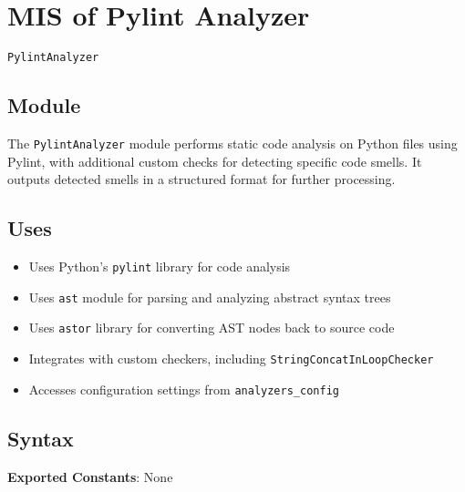 \documentclass[12pt, titlepage]{article}
\begin{document}
  
  
\newpage

\section{MIS of Pylint Analyzer} \label{mis:PylintAnalyzer}

\texttt{PylintAnalyzer}

\subsection{Module}

The \texttt{PylintAnalyzer} module performs static code analysis on Python files using Pylint, with additional custom checks for detecting specific code smells. It outputs detected smells in a structured format for further processing.

\subsection{Uses}
\begin{itemize}
  \item Uses Python's \texttt{pylint} library for code analysis
  \item Uses \texttt{ast} module for parsing and analyzing abstract syntax trees
  \item Uses \texttt{astor} library for converting AST nodes back to source code
  \item Integrates with custom checkers, including \texttt{StringConcatInLoopChecker}
  \item Accesses configuration settings from \texttt{analyzers\_config}
\end{itemize}

\subsection{Syntax}
\noindent
\textbf{Exported Constants}: None
\end{document}

